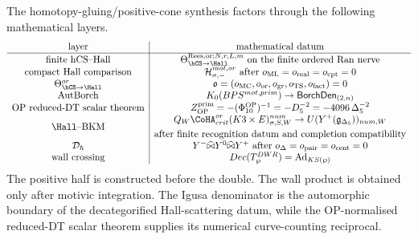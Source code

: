 \begin{proposition}
\label{gluing:prop:eight-object-resolution-package}
The homotopy-gluing/positive-cone synthesis factors through the
following mathematical layers.
\[
\begin{array}{c|c}
\textup{layer} & \textup{mathematical datum}\\ \hline
\textup{finite hCS--Hall}
& \Theta_{\hCS\to\Hall}^{\mathrm{Rees},\mathrm{or};N,r,L,m}
\textup{ on the finite ordered Ran nerve}\\
\textup{compact Hall comparison}
& \mathcal H^{mot,or}_{\sigma,-}
\textup{ after }o_{\mathrm{ML}}=o_{\mathrm{real}}=o_{\mathrm{cpt}}=0\\
\Theta^{or}_{\hCS\to\Hall}
& \mathfrak o=(o_{\mathrm{MC}},o_{\mathrm{or}},o_{\mathrm{gr}},
o_{\mathrm{TS}},o_{\mathrm{fact}})=0\\
\operatorname{AutBorch}
& K_0(BPS^{mot,prim})\to \mathsf{BorchDen}_{(2,n)}\\
\textup{OP reduced-DT scalar theorem}
& Z_{\mathrm{OP}}^{\mathrm{prim}}
=-(\Phi_{10}^{\mathrm{OP}})^{-1}
=-D_5^{-2}
=-4096\,\Delta_5^{-2}\\
\Hall\textup{--}\mathrm{BKM}
& \begin{gathered}
Q_W\CoHA^{or}_{crit}(K3\times E)_{\sigma,S,W}^{num}
\to U(Y^+(\mathfrak g_{\Delta_5}))_{num,W}\\
\textup{after finite recognition datum and completion compatibility}
\end{gathered}\\
\mathcal D_\hbar
& Y^-\widehat\bowtie Y^0\widehat\bowtie Y^+
\textup{ after }o_\Delta=o_{\mathrm{pair}}=o_{\mathrm{cent}}=0\\
\textup{wall crossing}
& Dec(T^{DWR}_{\wp})=\operatorname{Ad}_{KS(\wp)}
\end{array}
\]
The positive half is constructed before the double. The wall product is
obtained only after motivic integration. The Igusa denominator is the
automorphic boundary of the decategorified Hall-scattering datum, while
the OP-normalised reduced-DT scalar theorem supplies its numerical
curve-counting reciprocal.
\end{proposition}

